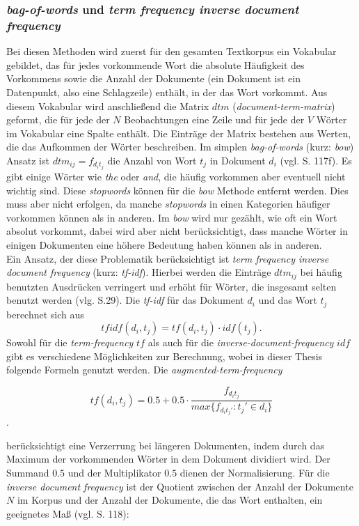 \documentclass[a4paper,11pt]{article}
\begin{document}
\subsubsection{\textit{bag-of-words} und \textit{term frequency inverse document frequency}} \label{Kap:Tfidf}

Bei diesen Methoden wird zuerst für den gesamten Textkorpus ein Vokabular gebildet, das für jedes vorkommende Wort die absolute Häufigkeit des Vorkommens sowie die Anzahl der Dokumente (ein Dokument ist ein Datenpunkt, also eine Schlagzeile) enthält, in der das Wort vorkommt. Aus diesem Vokabular wird anschließend die Matrix $dtm$ (\textit{document-term-matrix}) geformt, die für jede der $N$ Beobachtungen eine Zeile und für jede der $V$ Wörter im Vokabular eine Spalte enthält. Die Einträge der Matrix bestehen aus Werten, die das Aufkommen der Wörter beschreiben. Im simplen \textit{bag-of-words} (kurz: \textit{bow}) Ansatz ist $dtm_{ij} = f_{d_i t_j}$ die Anzahl von Wort $t_j$ in Dokument $d_i$ (vgl. \cite{deepEssentials} S. 117f). Es gibt einige Wörter wie \textit{the} oder \textit{and}, die häufig vorkommen aber eventuell nicht wichtig sind. Diese \textit{stopwords} können für die \textit{bow} Methode entfernt werden. Dies muss aber nicht erfolgen, da manche \textit{stopwords} in einen Kategorien häufiger vorkommen können als in anderen.
Im \textit{bow} wird nur gezählt, wie oft ein Wort absolut vorkommt, dabei wird aber nicht berücksichtigt, dass manche Wörter in einigen Dokumenten eine höhere Bedeutung haben können als in anderen. \\

Ein Ansatz, der diese Problematik berücksichtigt ist \textit{term frequency inverse document frequency} (kurz: \textit{tf-idf}). Hierbei werden die Einträge $dtm_{ij}$ bei häufig benutzten Ausdrücken verringert und erhöht für Wörter, die insgesamt selten benutzt werden (vlg. \cite{textMiningR} S.29). Die \textit{tf-idf} für das Dokument $d_i$ und das Wort $t_j$ berechnet sich aus 
\[tfidf(d_i, t_j) = tf(d_i,t_j) \cdot idf(t_j) . \]
Sowohl für die \textit{term-frequency} $tf$ als auch für die \textit{inverse-document-frequency} $idf$ gibt es verschiedene Möglichkeiten zur Berechnung, wobei in dieser Thesis folgende Formeln genutzt werden.
Die \textit{augmented-term-frequency}

\[tf(d_i,t_j) = 0.5 +  0.5 \cdot \frac{f_{d_i t_j}}{max \{ f_{d_i t_j'}: t_j' \in d_i \}} \].

berücksichtigt eine Verzerrung bei längeren Dokumenten, indem durch das Maximum der vorkommenden Wörter in dem Dokument dividiert wird. Der Summand $0.5$ und der Multiplikator $0.5$ dienen der Normalisierung. Für die \textit{inverse document frequency} ist der Quotient zwischen der Anzahl der Dokumente $N$ im Korpus und der Anzahl der Dokumente, die das Wort enthalten, ein geeignetes Maß (vgl. \cite{deepEssentials} S. 118):
\end{document}
